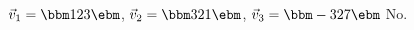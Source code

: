 {$\vec{v}_1 = \bbm 1\\2\\3\ebm$, $\vec{v}_2 = \bbm 3\\2\\1\ebm$, $\vec{v}_3 = \bbm -3\\2\\7\ebm$}
{No.}